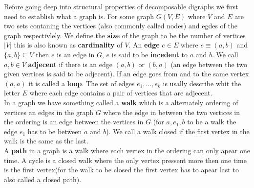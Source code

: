 Before going deep into structural properties of decomposable digraphs we first need to establish what a graph is.
For some graph $G(V,E)$ where $V$ and $E$ are two sets contaning the vertices (also commonly called nodes) and egdes of the graph respectivlely.
We define the \textbf{size} of the graph to be the number of vertices $|V|$ this is also known as \textbf{cardinality} of $V$.
An \textbf{edge} $e \in E$ where $e \equiv (a, b)$ and $\{ a, b \} \subseteq V$ then $e$ is an edge in $G$, $e$ is said to be \textbf{incedent} to $a$ and $b$. 
We call $a,b \in V$ \textbf{adjecent} if there is an edge $(a,b)$ or $(b,a)$ (an edge between the two given vertices is said to be adjecent).
If an edge goes from and to the same vertex $(a,a)$ it is called a \textbf{loop}.
The set of edges $e_1, \dots, e_k$ is usally describe whit the letter $E$ where each edge contains a pair of vertices that are adjecent. \\
In a graph we have something called a \textbf{walk} which is a alternately ordering of vertices an edges in the graph $G$ where the edge in between the two vertices in the ordering is an edge between the vertices in $G$ (for $a,e_1,b$ to be a walk the edge $e_1$ has to be between $a$ and $b$).
We call a walk closed if the first vertex in the walk is the same as the last.\\
A \textbf{path} in a graph is a walk where each vertex in the ordering can only apear one time. A cycle is a closed walk where the only vertex pressent more then one time is the first vertex(for the walk to be closed the first vertex has to apear last to also called a closed path).

